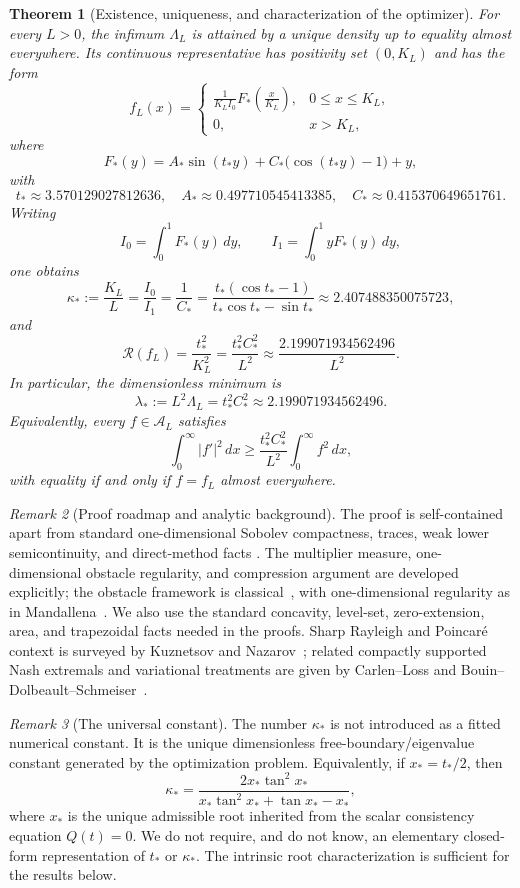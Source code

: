 \documentclass[11pt]{article}
\newtheorem{theorem}{Theorem}[section]
\theoremstyle{definition}
\theoremstyle{remark}
\newtheorem{remark}[theorem]{Remark}
\newcommand{\A}{\mathcal A}
\newcommand{\Rcal}{\mathcal R}
\begin{document}
\begin{theorem}[Existence, uniqueness, and characterization of the optimizer]\label{thm:main}
For every $L>0$, the infimum $\Lambda_L$ is attained by a unique density up
to equality almost everywhere. Its continuous representative has positivity
set $(0,K_L)$ and has the form
\[
 f_L(x)=
 \begin{cases}
 \displaystyle\frac{1}{K_L I_0}F_*\!\left(\frac{x}{K_L}\right),&0\leq x\leq K_L,\\[7pt]
 0,&x>K_L,
 \end{cases}
\]
where
\[
 F_*(y)=A_*\sin(t_*y)+C_*\bigl(\cos(t_*y)-1\bigr)+y,
\]
with
\[
 t_*\approx3.570129027812636,
\quad A_*\approx0.497710545413385,
\quad C_*\approx0.415370649651761.
\]
Writing
\[
 I_0=\int_0^1F_*(y)\,dy,
\qquad I_1=\int_0^1yF_*(y)\,dy,
\]
one obtains
\[
 \kappa_*:=\frac{K_L}{L}=\frac{I_0}{I_1}=\frac{1}{C_*}
 =\frac{t_*(\cos t_*-1)}{t_*\cos t_*-\sin t_*}
 \approx2.407488350075723,
\]
and
\[
 \Rcal(f_L)=\frac{t_*^2}{K_L^2}
 =\frac{t_*^2 C_*^2}{L^2}
 \approx\frac{2.199071934562496}{L^2}.
\]
In particular, the dimensionless minimum is
\[
 \lambda_*:=L^2\Lambda_L=t_*^2C_*^2
 \approx2.199071934562496.
\]
Equivalently, every $f\in\A_L$ satisfies
\[
 \int_0^\infty |f'|^2\,dx
 \geq \frac{t_*^2C_*^2}{L^2}\int_0^\infty f^2\,dx,
\]
with equality if and only if $f=f_L$ almost everywhere.
\end{theorem}

\begin{remark}[Proof roadmap and analytic background]\label{rem:standard-inputs}
The proof is self-contained apart from standard one-dimensional Sobolev
compactness, traces, weak lower semicontinuity, and direct-method facts
\cite{Brezis,LiebLoss}. The multiplier measure, one-dimensional obstacle
regularity, and compression argument are developed explicitly; the obstacle
framework is classical~\cite{KinderlehrerStampacchia,Friedman}, with
one-dimensional regularity as in Mandallena~\cite{Mandallena}. We also use the
standard concavity, level-set, zero-extension, area, and trapezoidal facts
needed in the proofs. Sharp Rayleigh and Poincaré context is surveyed by
Kuznetsov and Nazarov~\cite{KuznetsovNazarov}; related compactly supported Nash
extremals and variational treatments are given by Carlen--Loss
\cite{CarlenLoss} and Bouin--Dolbeault--Schmeiser~\cite{BouinDolbeaultSchmeiser}.
\end{remark}

\begin{remark}[The universal constant]
The number $\kappa_*$ is not introduced as a fitted numerical constant. It
is the unique dimensionless free-boundary/eigenvalue constant generated by the
optimization problem. Equivalently, if $x_*=t_*/2$, then
\[
 \kappa_*=
 \frac{2x_*\tan^2 x_*}
 {x_*\tan^2 x_*+\tan x_*-x_*},
\]
where $x_*$ is the unique admissible root inherited from the scalar
consistency equation $Q(t)=0$. We do not require, and do not know, an elementary closed-form representation of
$t_*$ or $\kappa_*$. The intrinsic root characterization is sufficient for the
results below.
\end{remark}
\end{document}
